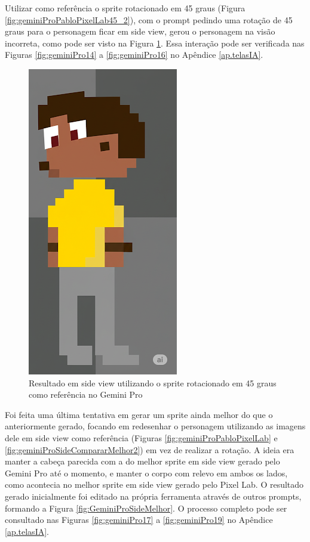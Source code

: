 Utilizar como referência o sprite rotacionado em 45 graus (Figura \ref{fig:geminiProPabloPixelLab45_2}), com o prompt pedindo uma rotação de 45 graus para o personagem ficar em side view, gerou o personagem na visão incorreta, como pode ser visto na Figura \ref{fig:GeminiPro45Melhor}. Essa interação pode ser verificada nas Figuras \ref{fig:geminiPro14} a \ref{fig:geminiPro16} no Apêndice \ref{ap.telasIA}.

\begin{figure}[htbp]
    \centering
    \caption{\small Resultado em side view utilizando o sprite rotacionado em 45 graus como referência no Gemini Pro}
    \label{fig:GeminiPro45Melhor}
    \includegraphics[width=0.2\linewidth]{figs/geminiPro/chat5/tela4_res2.png}
\end{figure}

Foi feita uma última tentativa em gerar um sprite ainda melhor do que o anteriormente gerado, focando em redesenhar o personagem utilizando as imagens dele em side view como referência (Figuras \ref{fig:geminiProPabloPixelLab} e \ref{fig:geminiProSideCompararMelhor2}) em vez de realizar a rotação. A ideia era manter a cabeça parecida com a do melhor sprite em side view gerado pelo Gemini Pro até o momento, e manter o corpo com relevo em ambos os lados, como acontecia no melhor sprite em side view gerado pelo Pixel Lab. O resultado gerado inicialmente foi editado na própria ferramenta através de outros prompts, formando a Figura \ref{fig:GeminiProSideMelhor}. O processo completo pode ser consultado nas Figuras \ref{fig:geminiPro17} a \ref{fig:geminiPro19} no Apêndice \ref{ap.telasIA}.

